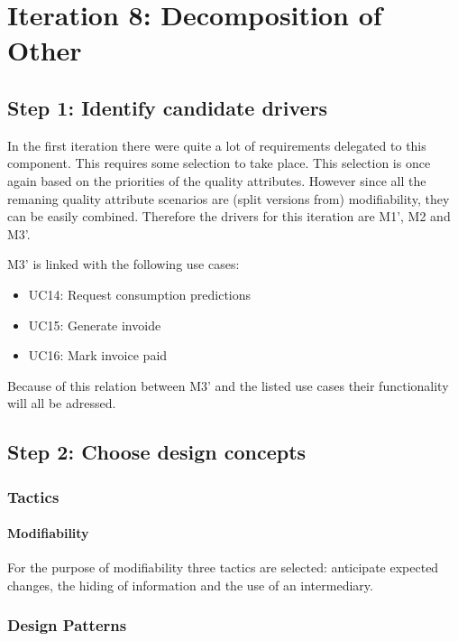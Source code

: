\section{Iteration 8: Decomposition of Other}
\label{add:it8}

\subsection{Step 1: Identify candidate drivers}
\label{add:it8/drivers}

\npar In the first iteration there were quite a lot of requirements delegated to
this component. This requires some selection to take place. This selection is
once again based on the priorities of the quality attributes. However since all
the remaning quality attribute scenarios are (split versions from)
modifiability, they can be easily combined. Therefore the drivers for this
iteration are M1', M2 and M3'. 

\npar M3' is linked with the following use cases:

\begin{itemize}
  \item UC14: Request consumption predictions
  \item UC15: Generate invoide
  \item UC16: Mark invoice paid
\end{itemize}

\npar Because of this relation between M3' and the listed use cases their
functionality will all be adressed.

\subsection{Step 2: Choose design concepts}
\label{add:it8/concepts}

\subsubsection{Tactics}
\label{add:it8/tactics}

\paragraph{Modifiability}

\npar For the purpose of modifiability three tactics are selected: anticipate
expected changes, the hiding of information and the use of an intermediary.

\subsubsection{Design Patterns}
\label{add:it8/patterns}

